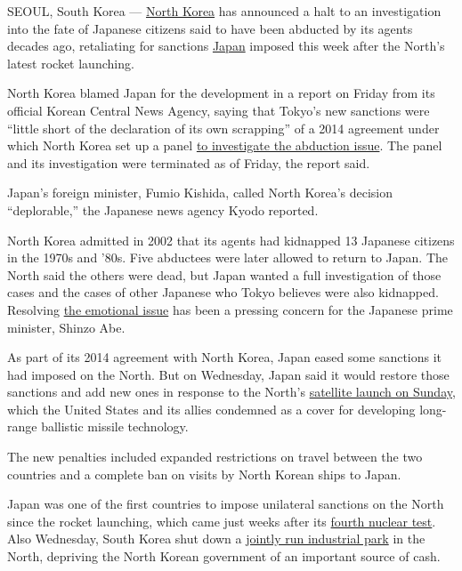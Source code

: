 SEOUL, South Korea ---
\href{http://topics.nytimes.com/top/news/international/countriesandterritories/northkorea/index.html?inline=nyt-geo}{North
Korea} has announced a halt to an investigation into the fate of
Japanese citizens said to have been abducted by its agents decades ago,
retaliating for sanctions
\href{http://topics.nytimes.com/top/news/international/countriesandterritories/japan/index.html?inline=nyt-geo}{Japan}
imposed this week after the North's latest rocket launching.

North Korea blamed Japan for the development in a report on Friday from
its official Korean Central News Agency, saying that Tokyo's new
sanctions were ``little short of the declaration of its own scrapping''
of a 2014 agreement under which North Korea set up a panel
\href{http://www.nytimes.com/2014/05/30/world/asia/north-korea-agrees-to-investigate-fate-of-japanese-abducted-decades-ago.html}{to
investigate the abduction issue}. The panel and its investigation were
terminated as of Friday, the report said.

Japan's foreign minister, Fumio Kishida, called North Korea's decision
``deplorable,'' the Japanese news agency Kyodo reported.

North Korea admitted in 2002 that its agents had kidnapped 13 Japanese
citizens in the 1970s and '80s. Five abductees were later allowed to
return to Japan. The North said the others were dead, but Japan wanted a
full investigation of those cases and the cases of other Japanese who
Tokyo believes were also kidnapped. Resolving
\href{http://www.nytimes.com/2014/03/17/world/asia/parents-of-japanese-woman-kidnapped-by-north-korea-meet-their-granddaughter.html}{the
emotional issue} has been a pressing concern for the Japanese prime
minister, Shinzo Abe.

As part of its 2014 agreement with North Korea, Japan eased some
sanctions it had imposed on the North. But on Wednesday, Japan said it
would restore those sanctions and add new ones in response to the
North's
\href{http://www.nytimes.com/2016/02/07/world/asia/north-korea-moves-up-rocket-launching-plan.html}{satellite
launch on Sunday}, which the United States and its allies condemned as a
cover for developing long-range ballistic missile technology.

The new penalties included expanded restrictions on travel between the
two countries and a complete ban on visits by North Korean ships to
Japan.

Japan was one of the first countries to impose unilateral sanctions on
the North since the rocket launching, which came just weeks after its
\href{http://www.nytimes.com/2016/01/07/world/asia/north-korea-hydrogen-bomb-q-a.html}{fourth
nuclear test}. Also Wednesday, South Korea shut down a
\href{http://www.nytimes.com/2016/02/12/world/asia/north-south-korea-kaesong.html}{jointly
run industrial park} in the North, depriving the North Korean government
of an important source of cash.

